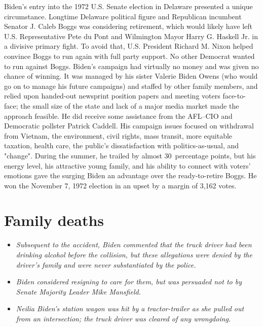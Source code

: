 Biden's entry into the 1972 U.S. Senate election in Delaware presented a
unique circumstance. Longtime Delaware political figure and Republican
incumbent Senator J. Caleb Boggs was considering retirement, which would
likely have left U.S. Representative Pete du Pont and Wilmington Mayor
Harry G. Haskell Jr. in a divisive primary fight. To avoid that, U.S.
President Richard M. Nixon helped convince Boggs to run again with full
party support. No other Democrat wanted to run against Boggs. Biden's
campaign had virtually no money and was given no chance of winning. It
was managed by his sister Valerie Biden Owens (who would go on to manage
his future campaigns) and staffed by other family members, and relied
upon handed-out newsprint position papers and meeting voters
face-to-face; the small size of the state and lack of a major media
market made the approach feasible. He did receive some assistance from
the AFL--CIO and Democratic pollster Patrick Caddell. His campaign
issues focused on withdrawal from Vietnam, the environment, civil
rights, mass transit, more equitable taxation, health care, the public's
dissatisfaction with politics-as-usual, and "change". During the summer,
he trailed by almost 30~percentage points, but his energy level, his
attractive young family, and his ability to connect with voters'
emotions gave the surging Biden an advantage over the ready-to-retire
Boggs. He won the November 7, 1972 election in an upset by a margin of
3,162 votes.

\section{Family deaths}\label{family-deaths}

\begin{itemize}
\item
  \emph{Subsequent to the accident, Biden commented that the truck
  driver had been drinking alcohol before the collision, but these
  allegations were denied by the driver's family and were never
  substantiated by the police.}
\item
  \emph{Biden considered resigning to care for them, but was persuaded
  not to by Senate Majority Leader Mike Mansfield.}
\item
  \emph{Neilia Biden's station wagon was hit by a tractor-trailer as she
  pulled out from an intersection; the truck driver was cleared of any
  wrongdoing.}
\end{itemize}

